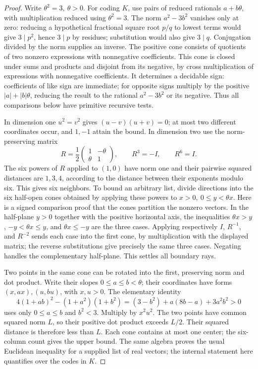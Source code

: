 \begin{proof}
Write \(\theta^2=3,\ \theta>0\). For coding \(K\), use pairs of reduced
rationals \(a+b\theta\), with multiplication reduced using \(\theta^2=3\).
The norm \(a^2-3b^2\) vanishes only at zero: reducing a hypothetical
fractional square root \(p/q\) to lowest terms would give \(3\mid p^2\),
hence \(3\mid p\) by residues; substitution would also give \(3\mid q\).
Conjugation divided by the norm supplies an inverse. The positive cone
consists of quotients of two nonzero expressions with nonnegative
coefficients. This cone is closed under sums and products and disjoint
from its negative, by cross multiplication of expressions with nonnegative
coefficients. It determines a decidable sign: coefficients of like sign
are immediate; for opposite signs multiply by the positive
\(|a|+|b|\theta\), reducing the result to the rational \(a^2-3b^2\)
or its negative. Thus all comparisons below have primitive recursive
tests.

In dimension one \(u^2=v^2\) gives \((u-v)(u+v)=0\); at most two
different coordinates occur, and \(1,-1\) attain the bound. In dimension
two use the norm-preserving matrix
\[
 R=\frac12\begin{pmatrix}1&-\theta\\ \theta&1\end{pmatrix},
 \qquad R^3=-I,\qquad R^6=I .
\]
The six powers of \(R\) applied to \((1,0)\) have norm one and their
pairwise squared distances are \(1,3,4\), according to the distance
between their exponents modulo six. This gives six neighbors. To bound
an arbitrary list, divide directions into the six half-open cones obtained
by applying these powers to \(x>0,\ 0\le y<\theta x\).
Here is a signed comparison proof that the cones partition the nonzero
vectors. In the half-plane \(y>0\) together with the positive horizontal
axis, the inequalities \(\theta x>y\), \(-y<\theta x\le y\), and
\(\theta x\le-y\) are the three cases. Applying respectively \(I\),
\(R^{-1}\), and \(R^{-2}\) sends each case into the first cone,
by multiplication with the displayed matrix; the reverse substitutions
give precisely the same three cases. Negating handles the complementary
half-plane. This settles all boundary rays.

Two points in the same cone can be rotated into the first, preserving
norm and dot product. Write their slopes \(0\le a\le b<\theta\); their
coordinates have forms \((x,ax),(u,bu)\), with \(x,u>0\).
The elementary identity
\[
 4(1+ab)^2-(1+a^2)(1+b^2)
   =(3-b^2)+a(8b-a)+3a^2b^2>0
\]
uses only \(0\le a\le b\) and \(b^2<3\).
Multiply by \(x^2u^2\). The two points have common squared norm \(L\),
so their positive dot product exceeds \(L/2\). Their squared distance
is therefore less than \(L\). Each cone contains at most one center;
the six-column count gives the upper bound. The same algebra proves the
usual Euclidean inequality for a supplied list of real vectors; the
internal statement here quantifies over the codes in \(K\).


\end{proof}
